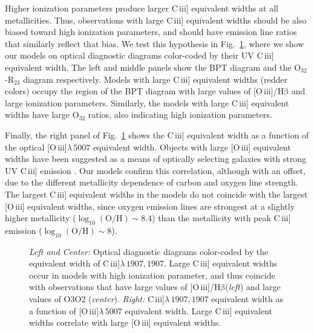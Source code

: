 \documentclass[preprint2]{aastex61}
\newcommand{\oiii}{[O\,{\sc iii}]\xspace}
\newcommand{\ciii}{C\,{\sc iii}]\xspace}
\newcommand{\hb}{\ensuremath{\mathrm{H\beta}}\xspace}
\begin{document}
Higher ionization parameters produce larger \ciii equivalent widths at all metallicities. Thus, observations with large \ciii equivalent widths should be also biased toward high ionization parameters, and should have emission line ratios that similarly reflect that bias. We test this hypothesis in Fig.~\ref{fig:CIIIBPT}, where we show our models on optical diagnostic diagrams color-coded by their UV \ciii equivalent width. The left and middle panels show the BPT diagram and the O$_{32}$-R$_{23}$ diagram respectively. Models with large \ciii equivalent widths (redder colors) occupy the region of the BPT diagram with large values of \oiii/\hb and large ionization parameters. Similarly, the models with large \ciii equivalent widths have large O$_{32}$ ratios, also indicating high ionization parameters.

Finally, the right panel of Fig.~\ref{fig:CIIIBPT} shows the \ciii equivalent width as a function of the optical \oiii$\lambda\,5007$ equivalent width. Objects with large \oiii equivalent widths have been suggested as a means of optically selecting galaxies with strong UV \ciii emission \citep{Berg+2016, Senchyna+2017}. Our models confirm this correlation, although with an offset, due to the different metallicity dependence of carbon and oxygen line strength. The largest \ciii equivalent widths in the models do not coincide with the largest \oiii equivalent widths, since oxygen emission lines are strongest at a slightly higher metallicity ($\log_{10}(\mathrm{O}/\mathrm{H})\sim 8.4$) than the metallicity with peak \ciii emission ($\log_{10}(\mathrm{O}/\mathrm{H})\sim 8$). 

\begin{figure}
  \begin{center}
    \caption{\emph{Left and Center:} Optical diagnostic diagrams color-coded by the equivalent width of \ciii$\lambda\,1907,1907$. Large \ciii equivalent widths occur in models with high ionization parameter, and thus coincide with observations that have large values of \oiii/\hb (\emph{left}) and large values of O3O2 (\emph{center}).  \emph{Right:} \ciii$\lambda\,1907,1907$ equivalent width as a function of \oiii$\lambda\,5007$ equivalent width. Large \ciii equivalent widths correlate with large \oiii equivalent widths.}
    \label{fig:CIIIBPT}
  \end{center}
\end{figure}
\end{document}
